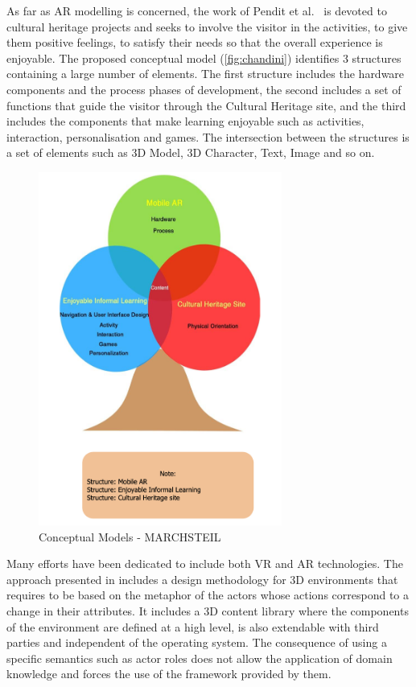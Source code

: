 As far as AR modelling is concerned, the work of Pendit et al.~\cite{chandini_pendit_conceptual_2015} is devoted to cultural heritage projects and seeks to involve the visitor in the activities, to give them positive feelings, to satisfy their needs so that the overall experience is enjoyable. The proposed conceptual model (\autoref{fig:chandini}) identifies 3 structures containing a large number of elements. The first structure includes the hardware components and the process phases of development, the second includes a set of functions that guide the visitor through the Cultural Heritage site, and the third includes the components that make learning enjoyable such as activities, interaction, personalisation and games. The intersection between the structures is a set of elements such as 3D Model, 3D Character, Text, Image and so on.

\begin{figure}[h]
    \centering
    \includegraphics[width=8cm]{Figures/Background/models/ChandiniP.png}
    \caption{Conceptual Models - MARCHSTEIL}
    \label{fig:chandini}
\end{figure}

Many efforts have been dedicated to include both VR and AR technologies. The approach presented in \cite{geiger_structured_2001} includes a design methodology for 3D environments that requires to be based on the metaphor of the actors whose actions correspond to a change in their attributes. It includes a 3D content library where the components of the environment are defined at a high level, is also extendable with third parties and independent of the operating system. The consequence of using a specific semantics such as actor roles does not allow the application of domain knowledge and forces the use of the framework provided by them.

